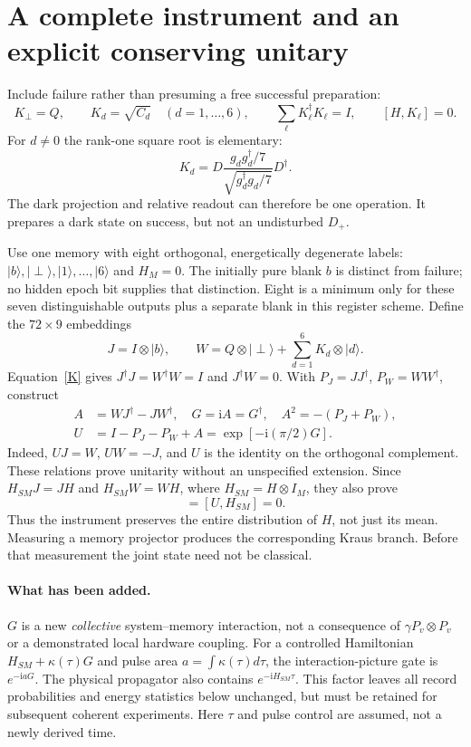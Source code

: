 \documentclass[11pt,a4paper]{article}
\newcommand{\ii}{\mathrm i}
\newcommand{\ket}[1]{|#1\rangle}
\begin{document}
\newpage
\section{A complete instrument and an explicit conserving unitary}
Include failure rather than presuming a free successful preparation:
\begin{equation}
 K_\perp=Q,\qquad K_d=\sqrt{C_d}\quad(d=1,\ldots,6),\qquad
 \sum_\ell K_\ell^\dagger K_\ell=I,\qquad [H,K_\ell]=0.\label{K}
\end{equation}
For $d\ne0$ the rank-one square root is elementary:
\begin{equation}
 K_d=D\frac{g_dg_d^\dagger/7}{\sqrt{g_d^\dagger g_d/7}}D^\dagger.
\end{equation}
The dark projection and relative readout can therefore be one operation.
It prepares a dark state on success, but not an undisturbed $D_+$.

Use one memory with eight orthogonal, energetically degenerate labels:
$\ket b,\ket\perp,\ket1,\ldots,\ket6$ and $H_M=0$.
The initially pure blank $b$ is distinct from failure; no hidden epoch
bit supplies that distinction. Eight is a minimum only for these seven
distinguishable outputs plus a separate blank in this register scheme.
Define the $72\times9$ embeddings
\begin{equation}
 J=I\otimes\ket b,\qquad
 W=Q\otimes\ket\perp+\sum_{d=1}^6 K_d\otimes\ket d.
\end{equation}
Equation~\eqref{K} gives $J^\dagger J=W^\dagger W=I$ and $J^\dagger W=0$.
With $P_J=JJ^\dagger$, $P_W=WW^\dagger$, construct
\begin{align}
 A&=WJ^\dagger-JW^\dagger,\quad G=\ii A=G^\dagger,\quad
 A^2=-(P_J+P_W),\\
 U&=I-P_J-P_W+A=\exp[-\ii(\pi/2)G].\label{U}
\end{align}
Indeed, $UJ=W$, $UW=-J$, and $U$ is the identity on the orthogonal
complement. These relations prove unitarity without an unspecified
extension. Since $H_{SM}J=JH$ and $H_{SM}W=WH$, where
$H_{SM}=H\otimes I_M$, they also prove
\begin{equation}
 [G,H_{SM}]=[U,H_{SM}]=0.\label{conserve}
\end{equation}
Thus the instrument preserves the entire distribution of $H$, not just
its mean. Measuring a memory projector produces the corresponding Kraus
branch. Before that measurement the joint state need not be classical.

\paragraph{What has been added.}
$G$ is a new \emph{collective} system--memory interaction, not a consequence
of $\gamma P_v\otimes P_v$ or a demonstrated local hardware coupling.
For a controlled Hamiltonian $H_{SM}+\kappa(\tau)G$ and pulse area
$a=\int\kappa(\tau)d\tau$, the interaction-picture gate is $e^{-\ii aG}$.
The physical propagator also contains $e^{-\ii H_{SM}\tau}$.
This factor leaves all record probabilities and energy statistics below
unchanged, but must be retained for subsequent coherent experiments.
Here $\tau$ and pulse control are assumed, not a newly derived time.
\end{document}

